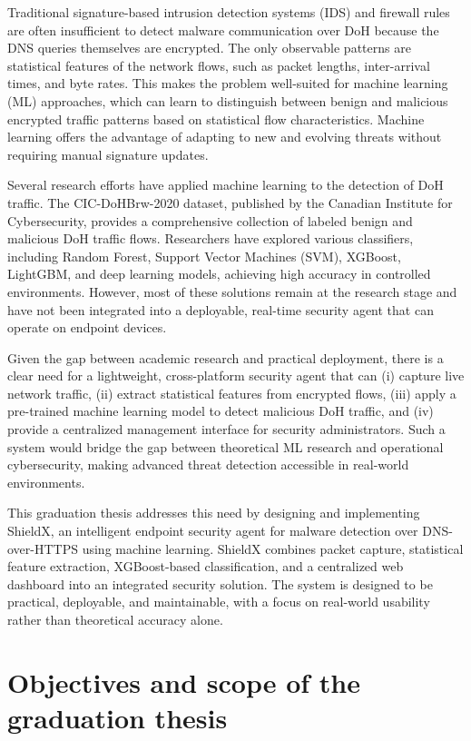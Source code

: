 \documentclass[../Main.tex]{subfiles}
\begin{document}
Traditional signature-based intrusion detection systems (IDS) and firewall rules are often insufficient to detect malware communication over DoH because the DNS queries themselves are encrypted. The only observable patterns are statistical features of the network flows, such as packet lengths, inter-arrival times, and byte rates. This makes the problem well-suited for machine learning (ML) approaches, which can learn to distinguish between benign and malicious encrypted traffic patterns based on statistical flow characteristics. Machine learning offers the advantage of adapting to new and evolving threats without requiring manual signature updates.

Several research efforts have applied machine learning to the detection of DoH traffic. The CIC-DoHBrw-2020 dataset, published by the Canadian Institute for Cybersecurity, provides a comprehensive collection of labeled benign and malicious DoH traffic flows. Researchers have explored various classifiers, including Random Forest, Support Vector Machines (SVM), XGBoost, LightGBM, and deep learning models, achieving high accuracy in controlled environments. However, most of these solutions remain at the research stage and have not been integrated into a deployable, real-time security agent that can operate on endpoint devices.

Given the gap between academic research and practical deployment, there is a clear need for a lightweight, cross-platform security agent that can (i) capture live network traffic, (ii) extract statistical features from encrypted flows, (iii) apply a pre-trained machine learning model to detect malicious DoH traffic, and (iv) provide a centralized management interface for security administrators. Such a system would bridge the gap between theoretical ML research and operational cybersecurity, making advanced threat detection accessible in real-world environments.

This graduation thesis addresses this need by designing and implementing ShieldX, an intelligent endpoint security agent for malware detection over DNS-over-HTTPS using machine learning. ShieldX combines packet capture, statistical feature extraction, XGBoost-based classification, and a centralized web dashboard into an integrated security solution. The system is designed to be practical, deployable, and maintainable, with a focus on real-world usability rather than theoretical accuracy alone.

\section{Objectives and scope of the graduation thesis}
\label{section:1.2}
\end{document}
